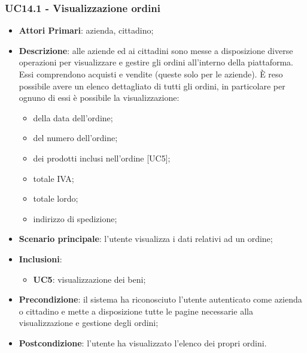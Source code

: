 \subsubsection{UC14.1 - Visualizzazione ordini}
\begin{itemize}
	\item \textbf{Attori Primari}: azienda, cittadino;
	\item \textbf{Descrizione}: alle aziende ed ai cittadini sono messe a disposizione diverse operazioni per visualizzare e gestire gli ordini all'interno della piattaforma. Essi comprendono acquisti e vendite (queste solo per le aziende). \`E reso possibile avere un elenco dettagliato di tutti gli ordini, in particolare per ognuno di essi è possibile la visualizzazione:
	\begin{itemize}
		\item della data dell'ordine;
		\item del numero dell'ordine;
		\item dei prodotti inclusi nell'ordine [UC5];
		\item totale IVA;
		\item totale lordo\glo;
		\item indirizzo di spedizione;
	\end{itemize}
	\item \textbf{Scenario principale}: l'utente visualizza i dati relativi ad un ordine;
	\item \textbf{Inclusioni}:
	\begin{itemize}
		\item \textbf{UC5}: visualizzazione dei beni;
	\end{itemize}
	\item \textbf{Precondizione}: il sistema ha riconosciuto l'utente autenticato come azienda o cittadino e mette a disposizione tutte le pagine necessarie alla visualizzazione e gestione degli ordini;
	\item \textbf{Postcondizione}: l'utente ha visualizzato l'elenco dei propri ordini.
\end{itemize} 


